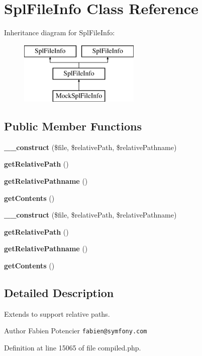 \section{Spl\+File\+Info Class Reference}
\label{class_symfony_1_1_component_1_1_finder_1_1_spl_file_info}
Inheritance diagram for Spl\+File\+Info\+:\begin{figure}[H]
\begin{center}
\leavevmode
\includegraphics[height=3.000000cm]{class_symfony_1_1_component_1_1_finder_1_1_spl_file_info}
\end{center}
\end{figure}
\subsection*{Public Member Functions}
\begin{DoxyCompactItemize}
\item 
{\bf \+\_\+\+\_\+construct} (\$file, \$relative\+Path, \$relative\+Pathname)
\item 
{\bf get\+Relative\+Path} ()
\item 
{\bf get\+Relative\+Pathname} ()
\item 
{\bf get\+Contents} ()
\item 
{\bf \+\_\+\+\_\+construct} (\$file, \$relative\+Path, \$relative\+Pathname)
\item 
{\bf get\+Relative\+Path} ()
\item 
{\bf get\+Relative\+Pathname} ()
\item 
{\bf get\+Contents} ()
\end{DoxyCompactItemize}


\subsection{Detailed Description}
Extends  to support relative paths.

\begin{DoxyAuthor}{Author}
Fabien Potencier {\tt fabien@symfony.\+com} 
\end{DoxyAuthor}


Definition at line 15065 of file compiled.\+php.



